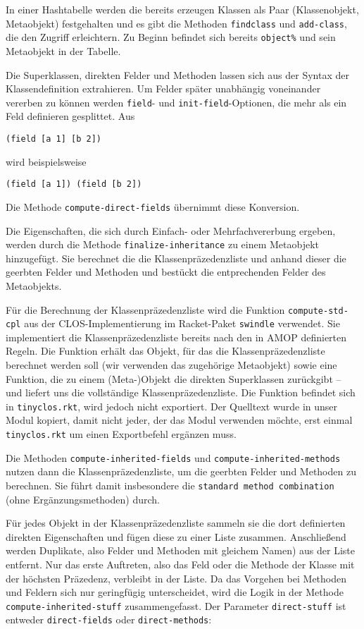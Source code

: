 In einer Hashtabelle werden die bereits erzeugen Klassen als Paar (Klassenobjekt, Metaobjekt) festgehalten und es gibt die Methoden \texttt{findclass} und \texttt{add-class}, die den Zugriff erleichtern. Zu Beginn befindet sich bereits \texttt{object\%} und sein Metaobjekt in der Tabelle.

Die Superklassen, direkten Felder und Methoden lassen sich aus der Syntax der Klassendefinition extrahieren. Um Felder später unabhängig voneinander vererben zu können werden \texttt{field}- und \texttt{init-field}-Optionen, die mehr als ein Feld definieren gesplittet. Aus

\texttt{(field [a 1] [b 2])}

wird beispielsweise

\texttt{(field [a 1]) (field [b 2])}

Die Methode \texttt{compute-direct-fields} übernimmt diese Konversion.

Die Eigenschaften, die sich durch Einfach- oder Mehrfachvererbung ergeben, werden durch die Methode \texttt{finalize-inheritance} zu einem Metaobjekt hinzugefügt. Sie berechnet die die Klassenpräzedenzliste und anhand dieser die geerbten Felder und Methoden und bestückt die entprechenden Felder des Metaobjekts.

Für die Berechnung der Klassenpräzedenzliste wird die Funktion \texttt{compute-std-cpl} aus der CLOS-Implementierung im Racket-Paket \texttt{swindle} verwendet. Sie implementiert die Klassenpräzedenzliste bereits nach den in AMOP definierten Regeln. Die Funktion erhält das Objekt, für das die Klassenpräzedenzliste berechnet werden soll (wir verwenden das zugehörige Metaobjekt) sowie eine Funktion, die zu einem (Meta-)Objekt die direkten Superklassen zurückgibt -- und liefert uns die vollständige Klassenpräzedenzliste. Die Funktion befindet sich in \texttt{tinyclos.rkt}, wird jedoch nicht exportiert. Der Quelltext wurde in unser Modul kopiert, damit nicht jeder, der das Modul verwenden möchte, erst einmal \texttt{tinyclos.rkt} um einen Exportbefehl ergänzen muss. 

Die Methoden \texttt{compute-inherited-fields} und \texttt{compute-inherited-methods} nutzen dann die Klassenpräzedenzliste, um die geerbten Felder und Methoden zu berechnen. Sie führt damit insbesondere die \texttt{standard method combination} (ohne Ergänzungsmethoden) durch.

Für jedes Objekt in der Klassenpräzedenzliste sammeln sie die dort definierten direkten Eigenschaften und fügen diese zu einer Liste zusammen. Anschließend werden Duplikate, also Felder und Methoden mit gleichem Namen) aus der Liste entfernt. Nur das erste Auftreten, also das Feld oder die Methode der Klasse mit der höchsten Präzedenz, verbleibt in der Liste. Da das Vorgehen bei Methoden und Feldern sich nur geringfügig unterscheidet, wird die Logik in der Methode \texttt{compute-inherited-stuff} zusammengefasst. Der Parameter \texttt{direct-stuff} ist entweder \texttt{{\textquotesingle}direct-fields} oder \texttt{{\textquotesingle}direct-methods}:

